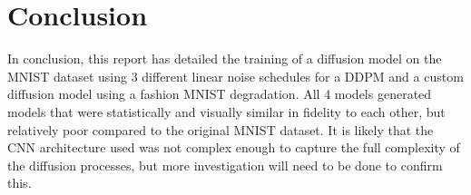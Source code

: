 
\section{Conclusion}\label{sec:conclusion}
In conclusion, this report has detailed the training of a diffusion model on the MNIST dataset using 3 different linear
noise schedules for a DDPM and a custom diffusion model using a fashion MNIST degradation.
All 4 models generated models that were statistically and visually similar in fidelity to each other, but relatively
poor compared to the original MNIST dataset.
It is likely that the CNN architecture used was not complex enough to capture the full complexity of the diffusion processes,
but more investigation will need to be done to confirm this.
